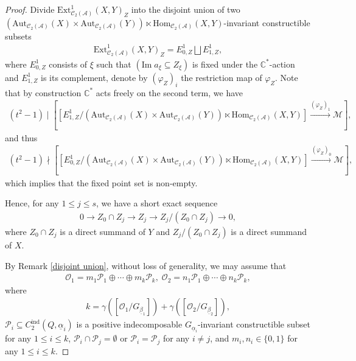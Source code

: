 \documentclass[12pt]{amsart}
\theoremstyle{definition}
\numberwithin{equation}{section}
\begin{document}
\begin{proof}
    Divide $ \mathrm{Ext}^1_{\mathcal{C}_2(\mathcal{A})}(X,Y)_{Z} $ into the disjoint union of two $ (\mathrm{Aut}_{\mathcal{C}_2(\mathcal{A})}(X) \times \mathrm{Aut}_{\mathcal{C}_2(\mathcal{A})}(Y)) \ltimes \mathrm{Hom}_{\mathcal{C}_2(\mathcal{A})}(X,Y) $-invariant constructible subsets
    \begin{align*}
         \mathrm{Ext}^1_{\mathcal{C}_2(\mathcal{A})}(X,Y)_{Z} = E^1_{0,Z} \bigsqcup E^1_{1,Z},
    \end{align*}
    where $ E^1_{0,Z} $ consists of $ \xi $ such that $ (\mathrm{Im}\;a_{\xi} \subseteq Z_{\xi}) $ is fixed under the $ \mathbb{C}^* $-action and $ E^1_{1,Z} $ is its complement, denote by $ (\varphi_{Z})_i  $ the restriction map of $ \varphi_{Z} $. 
    Note that by construction $ \mathbb{C}^* $ acts freely on the second term, we have
    \begin{align*}
        (t^2-1) \mid [[E^1_{1,Z}/(\mathrm{Aut}_{\mathcal{C}_2(\mathcal{A})}(X) \times \mathrm{Aut}_{\mathcal{C}_2(\mathcal{A})}(Y)) \ltimes \mathrm{Hom}_{\mathcal{C}_2(\mathcal{A})}(X,Y)] \xrightarrow{(\varphi_{Z})_1 } \mathcal{M}],
    \end{align*}
    and thus
    \begin{align*}
        (t^2-1) \nmid [[E^1_{0,Z}/(\mathrm{Aut}_{\mathcal{C}_2(\mathcal{A})}(X) \times \mathrm{Aut}_{\mathcal{C}_2(\mathcal{A})}(Y)) \ltimes \mathrm{Hom}_{\mathcal{C}_2(\mathcal{A})}(X,Y)] \xrightarrow{(\varphi_{Z})_0 } \mathcal{M}],
    \end{align*}
    which implies that the fixed point set is non-empty. 
   
    Hence, for any $ 1 \leqslant j \leqslant s $, we have a short exact sequence
    \begin{align*}
         0 \to Z_0 \cap Z_j \to Z_j \to Z_j/(Z_0 \cap Z_j) \to 0,
    \end{align*}
    where $ Z_0 \cap Z_j $ is a direct summand of $ Y $ and $ Z_j/(Z_0 \cap Z_j) $ is a direct summand of $ X $. 

    By Remark \ref{disjoint union}, without loss of generality, we may assume that
    \begin{align*}
        \mathcal{O}_1 = m_1\mathcal{P}_1 \oplus \cdots \oplus m_k \mathcal{P}_k,\; \mathcal{O}_2 = n_1\mathcal{P}_1 \oplus \cdots \oplus n_k \mathcal{P}_k,
    \end{align*}
    where
    \begin{align*}
         k= \gamma([\mathcal{O}_1/G_{\underline{\beta}_1}]) + \gamma([\mathcal{O}_2/G_{\underline{\beta}_2}]), 
    \end{align*}
    $ \mathcal{P}_i \subseteq C^{\mathrm{ind}}_2(Q,\underline{\alpha}_i) $ is a positive indecomposable $ G_{\underline{\alpha}_i} $-invariant   constructible subset for any $ 1 \leqslant i \leqslant k $, $ \mathcal{P}_i \cap \mathcal{P}_j = \emptyset $ or $ \mathcal{P}_i = \mathcal{P}_j $ for any $ i \neq j $, and $ m_i, n_i \in \{0,1\} $ for any $ 1 \leqslant i \leqslant k $. 


\end{proof}
\end{document}
